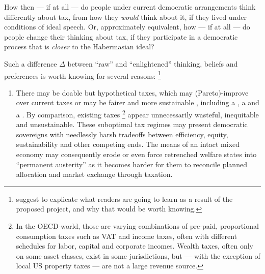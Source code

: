 How then --- if at all --- do people under current democratic arrangements think differently about tax, from how they \emph{would} think about it, if they lived under conditions of ideal speech.
Or, approximately equivalent, how --- if at all --- do people change their thinking about tax, if they participate in a democratic process that is \emph{closer} to the Habermasian ideal?

Such a difference $\Delta$ between ``raw'' and ``enlightened'' thinking, beliefs \citep{Caplan2007} and preferences \citep{Fishkin2009} is worth knowing for several reasons:
\footnote{
	\cite{PrzeworskiSalomon1995} suggest to explicate what readers are going to learn as a result of the proposed project, and why that would be worth knowing.
}
\begin{enumerate}
	\item 
		There may be doable but hypothetical taxes, which may (Pareto)-improve over current taxes \citep{Harberger1974} or may be fairer \citep{Rawls-1971-aa} and more sustainable \citep{Solow1956}, including a  \citep{Mill1848,McCaffery2002,Frank2005a,Seidman1997}, a  \citep{George1879,Buiter1988} and a  \citep{Friedman1962}.
		By comparison, existing taxes
		\footnote{
			In the \gls{OECD}-world, those are varying combinations of pre-paid, proportional consumption taxes such as \gls{VAT} and income taxes, often with different schedules for labor, capital and corporate incomes. Wealth taxes, often only on some asset classes, exist in some jurisdictions, but --- with the exception of local US property taxes --- are not a large revenue source.}
		appear unnecessarily wasteful, inequitable and unsustainable.
		These suboptimal tax regimes may present democratic sovereigns with needlessly harsh tradeoffs between efficiency, equity, sustainability and other competing ends.
		The means of an intact mixed economy \citep{MusgThet1959,Stiglitz2011} may consequently erode or even force retrenched welfare states into ``permanent austerity'' \citep{Pierson2002,StreeckMertens2010} as it becomes harder for them to reconcile planned allocation and market exchange through taxation.
		

\end{enumerate}
